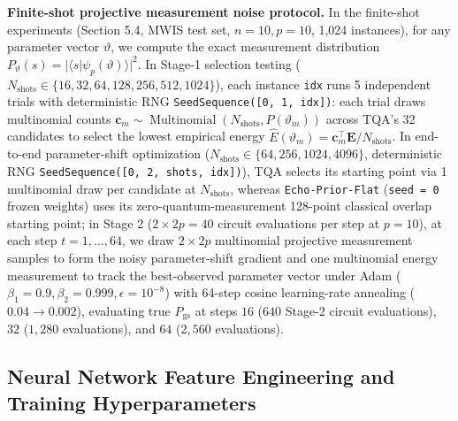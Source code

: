 \documentclass{article}
\theoremstyle{plain}
\theoremstyle{definition}
\begin{document}
\textbf{Finite-shot projective measurement noise protocol.} In the finite-shot experiments (Section 5.4, MWIS test set, $n=10, p=10$, 1,024 instances), for any parameter vector $\vartheta$, we compute the exact measurement distribution $P_\vartheta(s)=|\langle s|\psi_p(\vartheta)\rangle|^2$. In Stage-1 selection testing ($N_{\mathrm{shots}}\in\{16,32,64,128,256,512,1024\}$), each instance \texttt{idx} runs 5 independent trials with deterministic RNG \texttt{SeedSequence([0, 1, idx])}: each trial draws multinomial counts $\boldsymbol{c}_m\sim\operatorname{Multinomial}(N_{\mathrm{shots}},P(\vartheta_m))$ across TQA's 32 candidates to select the lowest empirical energy $\widehat E(\vartheta_m)=\boldsymbol{c}_m^\top\boldsymbol{E}/N_{\mathrm{shots}}$. In end-to-end parameter-shift optimization ($N_{\mathrm{shots}}\in\{64,256,1024,4096\}$, deterministic RNG \texttt{SeedSequence([0, 2, shots, idx])}), TQA selects its starting point via 1 multinomial draw per candidate at $N_{\mathrm{shots}}$, whereas \texttt{Echo-Prior-Flat} (\texttt{seed = 0} frozen weights) uses its zero-quantum-measurement 128-point classical overlap starting point; in Stage 2 ($2\times 2p=40$ circuit evaluations per step at $p=10$), at each step $t=1,\ldots,64$, we draw $2\times 2p$ multinomial projective measurement samples to form the noisy parameter-shift gradient and one multinomial energy measurement to track the best-observed parameter vector under Adam ($\beta_1=0.9, \beta_2=0.999, \epsilon=10^{-8}$) with 64-step cosine learning-rate annealing ($0.04\to 0.002$), evaluating true $P_{\mathrm{gs}}$ at steps $16$ ($640$ Stage-2 circuit evaluations), $32$ ($1{,}280$ evaluations), and $64$ ($2{,}560$ evaluations).

\subsection{Neural Network Feature Engineering and Training Hyperparameters}\label{subsec:b_3}
\end{document}
